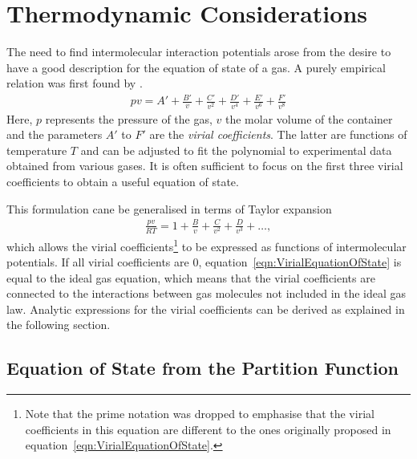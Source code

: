 \section{Thermodynamic Considerations}
\label{sec:ThermodynamicConsiderations}

The need to find intermolecular interaction potentials arose from the desire to
have a good description for the equation of state of a gas. A purely empirical
relation was first found by
\citeauthor{KamerlinghOnnes_Expressionequationstate_1902}.\autocite{KamerlinghOnnes_Expressionequationstate_1902}
%
\begin{align}
    pv=A'+\frac{B'}{v}+\frac{C'}{v^2}+\frac{D'}{v^4}+\frac{E'}{v^6}+\frac{F'}{v^8}
\end{align}
%
Here, $p$ represents the pressure of the gas, $v$ the molar volume of the
container and the parameters $A'$ to $F'$ are the \textit{virial coefficients}.
The latter are functions of temperature $T$ and can be adjusted to fit the
polynomial to experimental data obtained from various gases. It is often
sufficient to focus on the first three virial coefficients to obtain a useful
equation of state. 

This formulation cane be generalised in terms of Taylor expansion
%
\begin{align}
    \frac{pv}{RT}=1+\frac{B}{v}+\frac{C}{v^2}+\frac{D}{v^3}+\dots,\label{eqn:VirialEquationOfState}
\end{align}
%
which allows the virial coefficients\footnote{Note that the prime notation was
dropped to emphasise that the virial coefficients in this equation are different
to the ones originally proposed in equation~\eqref{eqn:VirialEquationOfState}.}
to be expressed as functions of intermolecular potentials. If all virial
coefficients are 0, equation~\eqref{eqn:VirialEquationOfState} is equal to the
ideal gas equation, which means that the virial coefficients are connected to
the interactions between gas molecules not included in the ideal gas law.
Analytic expressions for the virial coefficients can be derived as explained in
the following section.

\subsection{Equation of State from the Partition Function}
\label{sec:equationofstatefromthepartitionfunction}

